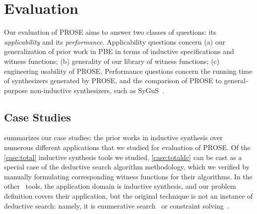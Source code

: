 \section{Evaluation}
\label{sec:prose:evaluation}
Our evaluation of PROSE aims to answer two classes of questions: its \emph{applicability} and its \emph{performance}.
Applicability questions concern (a) our generalization of prior work in PBE
in terms of inductive specifications and witness functions; (b) generality of our library of witness functions;
(c) engineering usability of PROSE.
Performance questions concern the running time of synthesizers generated by PROSE, and the comparison of
PROSE to general-purpose non-inductive synthesizers, such as SyGuS~\cite{sygus}.

\subsection{Case Studies}
\label{sec:prose:evaluation:casestudies}
 summarizes our case studies: the prior works in inductive synthesis over numerous different
applications that we studied for evaluation of PROSE.
Of the \ref*{case:total} inductive synthesis tools we studied, \ref*{case:totaldc} can be cast as a special case of the
deductive search algorithm
methodology, which we verified by manually formulating corresponding witness functions for their algorithms.
In the other \pgfmathresult~tools, the
application domain is inductive synthesis, and our problem definition covers their application, but the original
technique is not an instance of deductive search: namely, it is enumerative
search~\cite{transit:protocols,magichaskeller} or constraint solving~\cite{quicksilver}.

